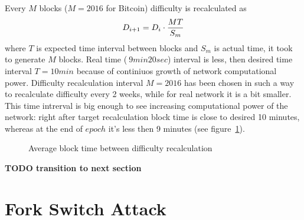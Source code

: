 \documentclass[number,preprint,review]{elsarticle}
\begin{document}
Every \(M\) blocks (\(M=2016\) for Bitcoin) difficulty is recalculated as
\begin{equation}
D_{i+1}=D_i\cdot {MT\over S_m}
\end{equation}
where \(T\) is expected time interval between blocks and \(S_m\) is actual time, it took to generate \(M\) blocks.
Real time (\(~ 9 min 20 sec\)) interval is less, then desired time interval \(T=10 min\) because of continiuos growth of network computational power.
Difficulty recalculation interval \(M=2016\) has been chosen in such a way to recalculate difficulty every 2 weeks, while for real network it is a bit smaller.
This time intrerval is big enough to see increasing computational power of the network: right after target recalculation block time is close to desired 10 minutes, whereas at the end of \(epoch\) it's less then 9 minutes (see figure~\ref{fig:image}).
\begin{figure}[h]
\caption{Average block time between difficulty recalculation}
\label{fig:image}
\end{figure}

\textbf{TODO transition to next section}

\section{Fork Switch Attack}
\label{sec:attack}
\end{document}
